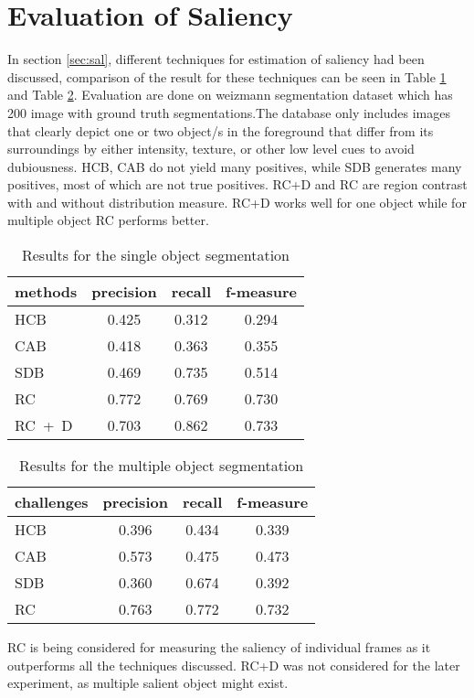 \section{Evaluation of Saliency}
\label{sec:EvS}
In section \ref{sec:sal}, different techniques for estimation of saliency had been discussed, comparison of the result for these techniques can be seen in Table \ref{tab:salOneObj} and Table \ref{tab:salTwoObj}. Evaluation are done on weizmann segmentation dataset which has 200 image with ground truth segmentations.The database only includes images that clearly depict one or two object/s in the foreground that differ from its surroundings by either intensity, texture, or other low level cues to avoid dubiousness. HCB, CAB do not yield many positives, while SDB generates many positives, most of which are not true positives. RC+D and RC are region contrast with and without distribution measure. RC+D works well for one object while for multiple object RC performs better.
\begin{table}[htbp]
   \caption{Results for the single object segmentation}
   \begin{center}
   \begin{tabular}{|l|c|c|c|} \hline
     methods & precision & recall & f-measure \\ \hline
     HCB & 0.425 & 0.312 & 0.294 \\
	 CAB & 0.418 & 0.363 & 0.355 \\
 	 SDB & 0.469 & 0.735 & 0.514 \\
	 RC  & 0.772 & 0.769 & 0.730 \\
	 RC~+~D & 0.703	& 0.862 & 0.733	\\ \hline
   \end{tabular}
   \label{tab:salOneObj}
   \medskip \small 
   \end{center}
 \end{table}
\begin{table}[htbp]
   \caption{Results for the multiple object segmentation}
   \begin{center}
   \begin{tabular}{|l|c|c|c|} \hline
     \textbf{challenges} & \textbf{precision} & \textbf{recall} & \textbf{f-measure} \\ \hline
     HCB & 0.396 & 0.434 & 0.339 \\
	 CAB & 0.573 & 0.475 & 0.473 \\
 	 SDB & 0.360 & 0.674 & 0.392 \\
	 RC  & 0.763 & 0.772 & 0.732 \\ \hline
   \end{tabular}
   \label{tab:salTwoObj}
   \end{center}
 \end{table} 
\par RC is being considered for measuring the saliency of individual frames as it outperforms all the techniques discussed. RC+D was not considered for the later experiment, as multiple salient object might exist.
 

